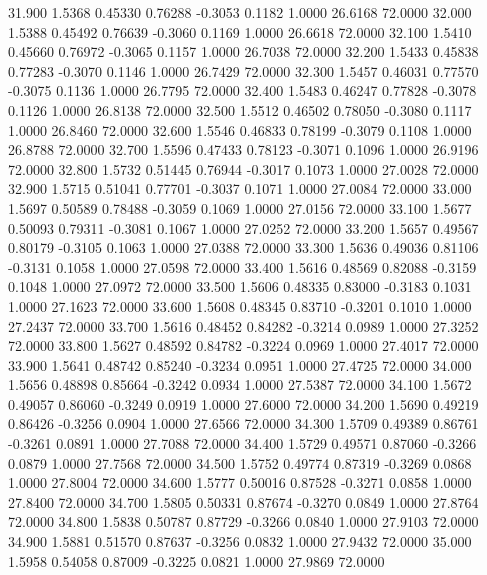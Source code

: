   31.900   1.5368   0.45330   0.76288  -0.3053   0.1182   1.0000  26.6168  72.0000
  32.000   1.5388   0.45492   0.76639  -0.3060   0.1169   1.0000  26.6618  72.0000
  32.100   1.5410   0.45660   0.76972  -0.3065   0.1157   1.0000  26.7038  72.0000
  32.200   1.5433   0.45838   0.77283  -0.3070   0.1146   1.0000  26.7429  72.0000
  32.300   1.5457   0.46031   0.77570  -0.3075   0.1136   1.0000  26.7795  72.0000
  32.400   1.5483   0.46247   0.77828  -0.3078   0.1126   1.0000  26.8138  72.0000
  32.500   1.5512   0.46502   0.78050  -0.3080   0.1117   1.0000  26.8460  72.0000
  32.600   1.5546   0.46833   0.78199  -0.3079   0.1108   1.0000  26.8788  72.0000
  32.700   1.5596   0.47433   0.78123  -0.3071   0.1096   1.0000  26.9196  72.0000
  32.800   1.5732   0.51445   0.76944  -0.3017   0.1073   1.0000  27.0028  72.0000
  32.900   1.5715   0.51041   0.77701  -0.3037   0.1071   1.0000  27.0084  72.0000
  33.000   1.5697   0.50589   0.78488  -0.3059   0.1069   1.0000  27.0156  72.0000
  33.100   1.5677   0.50093   0.79311  -0.3081   0.1067   1.0000  27.0252  72.0000
  33.200   1.5657   0.49567   0.80179  -0.3105   0.1063   1.0000  27.0388  72.0000
  33.300   1.5636   0.49036   0.81106  -0.3131   0.1058   1.0000  27.0598  72.0000
  33.400   1.5616   0.48569   0.82088  -0.3159   0.1048   1.0000  27.0972  72.0000
  33.500   1.5606   0.48335   0.83000  -0.3183   0.1031   1.0000  27.1623  72.0000
  33.600   1.5608   0.48345   0.83710  -0.3201   0.1010   1.0000  27.2437  72.0000
  33.700   1.5616   0.48452   0.84282  -0.3214   0.0989   1.0000  27.3252  72.0000
  33.800   1.5627   0.48592   0.84782  -0.3224   0.0969   1.0000  27.4017  72.0000
  33.900   1.5641   0.48742   0.85240  -0.3234   0.0951   1.0000  27.4725  72.0000
  34.000   1.5656   0.48898   0.85664  -0.3242   0.0934   1.0000  27.5387  72.0000
  34.100   1.5672   0.49057   0.86060  -0.3249   0.0919   1.0000  27.6000  72.0000
  34.200   1.5690   0.49219   0.86426  -0.3256   0.0904   1.0000  27.6566  72.0000
  34.300   1.5709   0.49389   0.86761  -0.3261   0.0891   1.0000  27.7088  72.0000
  34.400   1.5729   0.49571   0.87060  -0.3266   0.0879   1.0000  27.7568  72.0000
  34.500   1.5752   0.49774   0.87319  -0.3269   0.0868   1.0000  27.8004  72.0000
  34.600   1.5777   0.50016   0.87528  -0.3271   0.0858   1.0000  27.8400  72.0000
  34.700   1.5805   0.50331   0.87674  -0.3270   0.0849   1.0000  27.8764  72.0000
  34.800   1.5838   0.50787   0.87729  -0.3266   0.0840   1.0000  27.9103  72.0000
  34.900   1.5881   0.51570   0.87637  -0.3256   0.0832   1.0000  27.9432  72.0000
  35.000   1.5958   0.54058   0.87009  -0.3225   0.0821   1.0000  27.9869  72.0000
